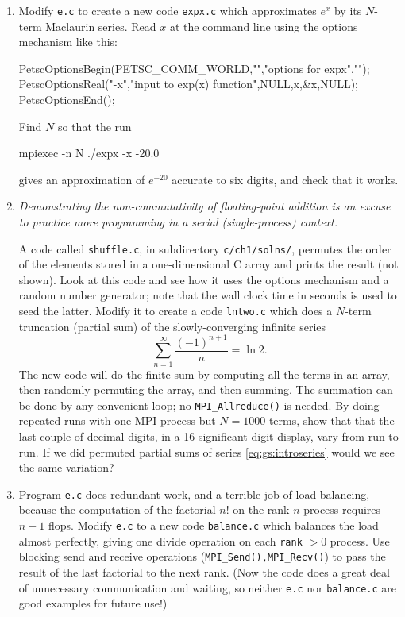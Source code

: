 \renewcommand{\labelenumi}{\arabic{chapter}.\arabic{enumi}\quad}
\begin{enumerate}

\item \label{exer:gs:expx}  Modify \texttt{e.c} to create a new code \texttt{expx.c} which approximates $e^x$ by its $N$-term Maclaurin series.  Read $x$ at the command line using the \PETSc options mechanism like this:
\begin{code}
  PetscOptionsBegin(PETSC_COMM_WORLD,"","options for expx","");
  PetscOptionsReal("-x","input to exp(x) function",NULL,x,&x,NULL);
  PetscOptionsEnd();
\end{code}
Find $N$ so that the run
\begin{cline}
mpiexec -n N ./expx -x -20.0
\end{cline}
gives an approximation of $e^{-20}$ accurate to six digits, and check that it works.

\item \label{exer:gs:nondeterminant}  \emph{Demonstrating the non-commutativity of floating-point addition is an excuse to practice more \PETSc programming in a serial (single-process) context.}

A code called \texttt{shuffle.c}, in subdirectory \texttt{c/ch1/solns/}, permutes the order of the elements stored in a one-dimensional C array and prints the result (not shown).  Look at this code and see how it uses the \PETSc options mechanism and a \PETSc random number generator; note that the wall clock time in seconds is used to seed the latter.  Modify it to create a code \texttt{lntwo.c} which does a $N$-term truncation (partial sum) of the slowly-converging infinite series
\begin{equation}
\sum_{n=1}^\infty \frac{(-1)^{n+1}}{n} = \ln 2.
\label{eq:gs:lntwo}
\end{equation}
The new code will do the finite sum by computing all the terms in an array, then randomly permuting the array, and then summing.  The summation can be done by any convenient loop; no \texttt{MPI\_Allreduce()} is needed.  By doing repeated runs with one MPI process but $N=1000$ terms, show that that the last couple of decimal digits, in a 16 significant digit display, vary from run to run.  If we did permuted partial sums of series \eqref{eq:gs:introseries} would we see the same variation?

\item \label{exer:gs:balance} Program \texttt{e.c} does redundant work, and a terrible job of load-balancing, because the computation of the factorial $n!$ on the rank $n$ process requires $n-1$ flops.  Modify \texttt{e.c} to a new code \texttt{balance.c} which balances the load almost perfectly, giving one divide operation on each \texttt{rank} $>0$ process.  Use blocking send and receive operations (\texttt{MPI\_Send(),MPI\_Recv()}) to pass the result of the last factorial to the next rank.  (Now the code does a great deal of unnecessary communication and waiting, so neither \texttt{e.c} nor \texttt{balance.c} are good examples for future use!)

\end{enumerate}
